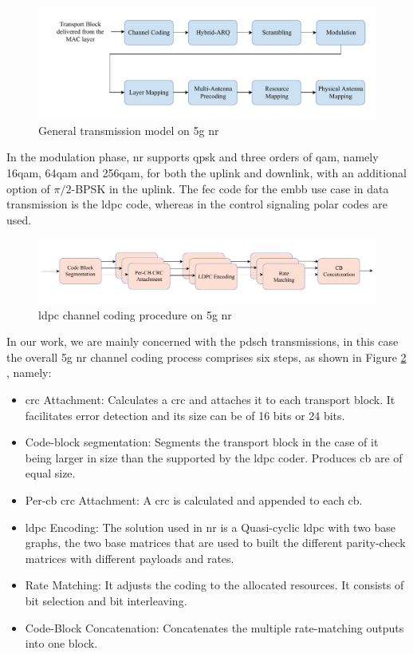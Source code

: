 \begin{figure}[htbp]
\includegraphics[width=\columnwidth]{figures/chp_theory/transmissionmodel.pdf}
\caption{General transmission model on \gls{5g} \gls{nr}}
\label{fig:transmission}
\end{figure}
%
In the modulation phase, \gls{nr} supports \gls{qpsk} and three orders of \gls{qam}, namely 16\gls{qam}, 64\gls{qam} and 256\gls{qam}, for both the uplink and downlink, with an additional option of $\pi/2$-BPSK in the uplink.
%
The \gls{fec} code for the \gls{embb} use case in data transmission is the \gls{ldpc} code, whereas in the control signaling polar codes are used.
%

\begin{figure}[htbp]
\includegraphics[width=\columnwidth]{figures/chp_theory/channelcoding2.pdf}
\caption{\gls{ldpc} channel coding procedure on \gls{5g} \gls{nr}}
\label{fig:channel-coding}
\end{figure}

In our work, we are mainly concerned with the \gls{pdsch} transmissions, in this case the overall \gls{5g} \gls{nr} channel coding process comprises six steps, as shown in Figure \ref{fig:channel-coding} \cite{ErikDahlman5G}, namely:
\begin{itemize}
	\item \Gls{crc} Attachment: Calculates a \gls{crc} and attaches it to each transport block. It facilitates error detection and its size can be of 16 bits or 24 bits.
	\item Code-block segmentation: Segments the transport block in the case of it being larger in size than the supported by the \gls{ldpc} coder. Produces \gls{cb} are of equal size.
	\item Per-\gls{cb} \gls{crc} Attachment: A \gls{crc} is calculated and appended to each \gls{cb}.
	\item \gls{ldpc} Encoding: The solution used in \gls{nr} is a Quasi-cyclic \gls{ldpc} with two base graphs, the two base matrices that are used to built the different parity-check matrices with different payloads and rates.
	\item Rate Matching: It adjusts the coding to the allocated resources. It consists of bit selection and bit interleaving.
	\item Code-Block Concatenation: Concatenates the multiple rate-matching outputs into one block.
\end{itemize}

